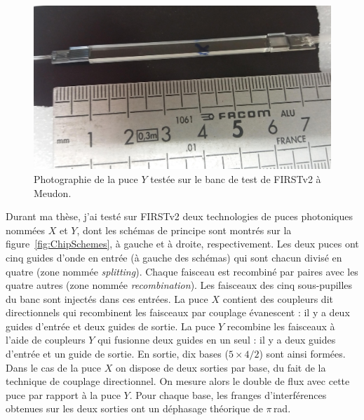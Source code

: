 \begin{figure}[ht!]
    \centering
    \includegraphics[width=\figwidth]{Figure_Chap2/PhotonicChip_5T_YComb_Meudon_04_crop.jpg}
    \caption[Photographie de la puce $Y$ testée sur le banc de test de \ac{FIRSTv2} à Meudon.]{Photographie de la puce $Y$ testée sur le banc de test de \ac{FIRSTv2} à Meudon.}
    \label{fig:ChipYPhoto}
\end{figure}

Durant ma thèse, j'ai testé \citep{barjot2020} sur \ac{FIRSTv2} deux technologies de puces photoniques nommées $X$ et $Y$, dont les schémas de principe sont montrés sur la figure~\ref{fig:ChipSchemes}, à gauche et à droite, respectivement. Les deux puces ont cinq guides d'onde en entrée (à gauche des schémas) qui sont chacun divisé en quatre (zone nommée \textit{splitting}). Chaque faisceau est recombiné par paires avec les quatre autres (zone nommée \textit{recombination}). Les faisceaux des cinq sous-pupilles du banc sont injectés dans ces entrées. La puce $X$ contient des coupleurs dit directionnels qui recombinent les faisceaux par couplage évanescent : il y a deux guides d'entrée et deux guides de sortie. La puce $Y$ recombine les faisceaux à l'aide de coupleurs $Y$ qui fusionne deux guides en un seul : il y a deux guides d'entrée et un guide de sortie. En sortie, dix bases ($5 \times 4 / 2$) sont ainsi formées. Dans le cas de la puce $X$ on dispose de deux sorties par base, du fait de la technique de couplage directionnel. On mesure alors le double de flux avec cette puce par rapport à la puce $Y$. Pour chaque base, les franges d'interférences obtenues sur les deux sorties ont un déphasage théorique de $\pi \,$rad.

